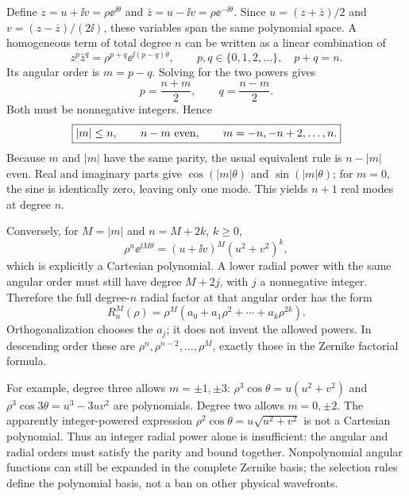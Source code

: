 Define $z=u+\ii v=\rho\ee^{\ii\theta}$ and $\bar z=u-\ii v=\rho\ee^{-\ii\theta}$. Since $u=(z+\bar z)/2$ and $v=(z-\bar z)/(2\ii)$, these variables span the same polynomial space. A homogeneous term of total degree $n$ can be written as a linear combination of
\begin{equation}
z^p\bar z^q=\rho^{p+q}\ee^{\ii(p-q)\theta},\qquad
p,q\in\{0,1,2,\ldots\},\quad p+q=n.
\end{equation}
Its angular order is $m=p-q$. Solving for the two powers gives
\begin{equation}
p=\frac{n+m}{2},\qquad q=\frac{n-m}{2}.
\end{equation}
Both must be nonnegative integers. Hence
\begin{equation}
\boxed{|m|\leq n,\qquad n-m\ \hbox{even},\qquad
m=-n,-n+2,\ldots,n.}
\end{equation}
Because $m$ and $|m|$ have the same parity, the usual equivalent rule is $n-|m|$ even. Real and imaginary parts give $\cos(|m|\theta)$ and $\sin(|m|\theta)$; for $m=0$, the sine is identically zero, leaving only one mode. This yields $n+1$ real modes at degree $n$.

Conversely, for $M=|m|$ and $n=M+2k$, $k\geq0$,
\begin{equation}
\rho^n\ee^{\ii M\theta}
=(u+\ii v)^M(u^2+v^2)^k,
\end{equation}
which is explicitly a Cartesian polynomial. A lower radial power with the same angular order must still have degree $M+2j$, with $j$ a nonnegative integer. Therefore the full degree-$n$ radial factor at that angular order has the form
\begin{equation}
R_n^M(\rho)=\rho^M\left(a_0+a_1\rho^2+\cdots+a_k\rho^{2k}\right).
\label{eq:selectionform}
\end{equation}
Orthogonalization chooses the $a_j$; it does not invent the allowed powers. In descending order these are $\rho^n,\rho^{n-2},\ldots,\rho^M$, exactly those in the Zernike factorial formula.

For example, degree three allows $m=\pm1,\pm3$: $\rho^3\cos\theta=u(u^2+v^2)$ and $\rho^3\cos3\theta=u^3-3uv^2$ are polynomials. Degree two allows $m=0,\pm2$. The apparently integer-powered expression $\rho^2\cos\theta=u\sqrt{u^2+v^2}$ is not a Cartesian polynomial. Thus an integer radial power alone is insufficient: the angular and radial orders must satisfy the parity and bound together. Nonpolynomial angular functions can still be expanded in the complete Zernike basis; the selection rules define the polynomial basis, not a ban on other physical wavefronts.

